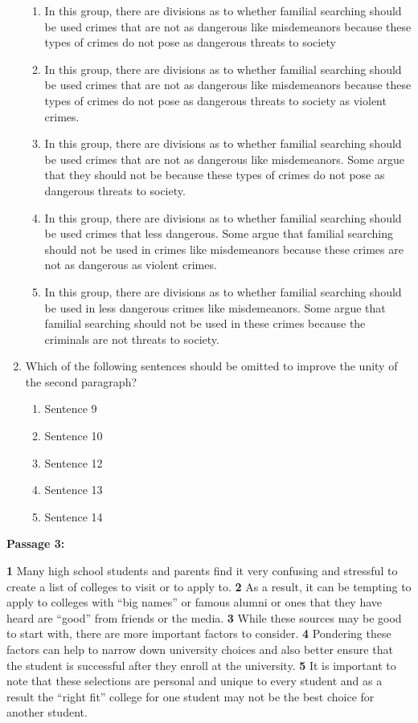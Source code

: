 \begin{enumerate}
\begin{enumerate}[label=(\Alph*)]
\item In this group, there are divisions as to whether familial searching should be used crimes that are not as dangerous like misdemeanors because these types of crimes do not pose as dangerous threats to society
\item In this group, there are divisions as to whether familial searching should be used crimes that are not as dangerous like misdemeanors because these types of crimes do not pose as dangerous threats to society as violent crimes.
\item In this group, there are divisions as to whether familial searching should be used crimes that are not as dangerous like misdemeanors. Some argue that they should not be because these types of crimes do not pose as dangerous threats to society.
\item In this group, there are divisions as to whether familial searching should be used crimes that less dangerous. Some argue that familial searching should not be used in crimes like misdemeanors because these crimes are not as dangerous as violent crimes.
\item In this group, there are divisions as to whether familial searching should be used in less dangerous crimes like misdemeanors. Some argue that familial searching should not be used in these crimes because the criminals are not threats to society.
\end{enumerate}

\item{Which of the following sentences should be omitted to improve the unity of the second paragraph?}
\begin{enumerate}[label=(\Alph*)]
\item{Sentence 9}
\item{Sentence 10}
\item{Sentence 12}
\item{Sentence 13}
\item{Sentence 14}
\end{enumerate}

\end{enumerate}

\bigskip
\textbf{Passage 3:}

\bigskip
\indent \textbf{1} Many high school students and parents find it very confusing and stressful to create a list of colleges to visit or to apply to. \textbf{2} As a result, it can be tempting to apply to colleges with ``big names'' or famous alumni or ones that they have heard are ``good'' from friends or the media. \textbf{3} While these sources may be good to start with, there are more important factors to consider. \textbf{4} Pondering these factors can help to narrow down university choices and also better ensure that the student is successful after they enroll at the university. \textbf{5} It is important to note that these selections are personal and unique to every student and as a result the ``right fit'' college for one student may not be the best choice for another student. 


